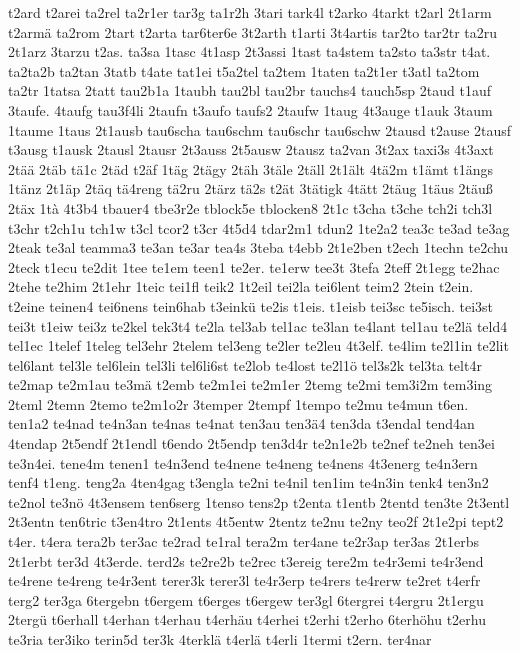 {t2ard
t2arei
ta2rel
ta2r1er
tar3g
ta1r2h
3tari
tark4l
t2arko
4tarkt
t2arl
2t1arm
t2armä
ta2rom
2tart
t2arta
tar6ter6e
3t2arth
t1arti
3t4artis
tar2to
tar2tr
ta2ru
2t1arz
3tarzu
t2as.
ta3sa
1tasc
4t1asp
2t3assi
1tast
ta4stem
ta2sto
ta3str
t4at.
ta2ta2b
ta2tan
3tatb
t4ate
tat1ei
t5a2tel
ta2tem
1taten
ta2t1er
t3atl
ta2tom
ta2tr
1tatsa
2tatt
tau2b1a
1taubh
tau2bl
tau2br
tauchs4
tauch5sp
2taud
t1auf
3taufe.
4taufg
tau3f4li
2taufn
t3aufo
taufs2
2taufw
1taug
4t3auge
t1auk
3taum
1taume
1taus
2t1ausb
tau6scha
tau6schm
tau6schr
tau6schw
2tausd
t2ause
2tausf
t3ausg
t1ausk
2tausl
2tausr
2t3auss
2t5ausw
2tausz
ta2van
3t2ax
taxi3s
4t3axt
2tää
2täb
tä1c
2täd
t2äf
1täg
2tägy
2täh
3täle
2täll
2t1ält
4tä2m
t1ämt
t1ängs
1tänz
2t1äp
2täq
tä4reng
tä2ru
2tärz
tä2s
t2ät
3tätigk
4tätt
2täug
1täus
2täuß
2täx
1tà
4t3b4
tbauer4
tbe3r2e
tblock5e
tblocken8
2t1c
t3cha
t3che
tch2i
tch3l
t3chr
t2ch1u
tch1w
t3cl
tcor2
t3cr
4t5d4
tdar2m1
tdun2
1te2a2
tea3c
te3ad
te3ag
2teak
te3al
teamma3
te3an
te3ar
tea4s
3teba
t4ebb
2t1e2ben
t2ech
1techn
te2chu
2teck
t1ecu
te2dit
1tee
te1em
teen1
te2er.
te1erw
tee3t
3tefa
2teff
2t1egg
te2hac
2tehe
te2him
2t1ehr
1teic
tei1fl
teik2
1t2eil
tei2la
tei6lent
teim2
2tein
t2ein.
t2eine
teinen4
tei6nens
tein6hab
t3einkü
te2is
t1eis.
t1eisb
tei3sc
te5isch.
tei3st
tei3t
t1eiw
tei3z
te2kel
tek3t4
te2la
tel3ab
tel1ac
te3lan
te4lant
tel1au
te2lä
teld4
tel1ec
1telef
1teleg
tel3ehr
2telem
tel3eng
te2ler
te2leu
4t3elf.
te4lim
te2l1in
te2lit
tel6lant
tel3le
tel6lein
tel3li
tel6li6st
te2lob
te4lost
te2l1ö
tel3s2k
tel3ta
telt4r
te2map
te2m1au
te3mä
t2emb
te2m1ei
te2m1er
2temg
te2mi
tem3i2m
tem3ing
2teml
2temn
2temo
te2m1o2r
3temper
2tempf
1tempo
te2mu
te4mun
t6en.
ten1a2
te4nad
te4n3an
te4nas
te4nat
ten3au
ten3ä4
ten3da
t3endal
tend4an
4tendap
2t5endf
2t1endl
t6endo
2t5endp
ten3d4r
te2n1e2b
te2nef
te2neh
ten3ei
te3n4ei.
tene4m
tenen1
te4n3end
te4nene
te4neng
te4nens
4t3energ
te4n3ern
tenf4
t1eng.
teng2a
4ten4gag
t3engla
te2ni
te4nil
ten1im
te4n3in
tenk4
ten3n2
te2nol
te3nö
4t3ensem
ten6serg
1tenso
tens2p
t2enta
t1entb
2tentd
ten3te
2t3entl
2t3entn
ten6tric
t3en4tro
2t1ents
4t5entw
2tentz
te2nu
te2ny
teo2f
2t1e2pi
tept2
t4er.
t4era
tera2b
ter3ac
te2rad
te1ral
tera2m
ter4ane
te2r3ap
ter3as
2t1erbs
2t1erbt
ter3d
4t3erde.
terd2s
te2re2b
te2rec
t3ereig
tere2m
te4r3emi
te4r3end
te4rene
te4reng
te4r3ent
terer3k
terer3l
te4r3erp
te4rers
te4rerw
te2ret
t4erfr
terg2
ter3ga
6tergebn
t6ergem
t6erges
t6ergew
ter3gl
6tergrei
t4ergru
2t1ergu
2tergü
t6erhall
t4erhan
t4erhau
t4erhäu
t4erhei
t2erhi
t2erho
6terhöhu
t2erhu
te3ria
ter3iko
terin5d
ter3k
4terklä
t4erlä
t4erli
1termi
t2ern.
ter4nar
}
